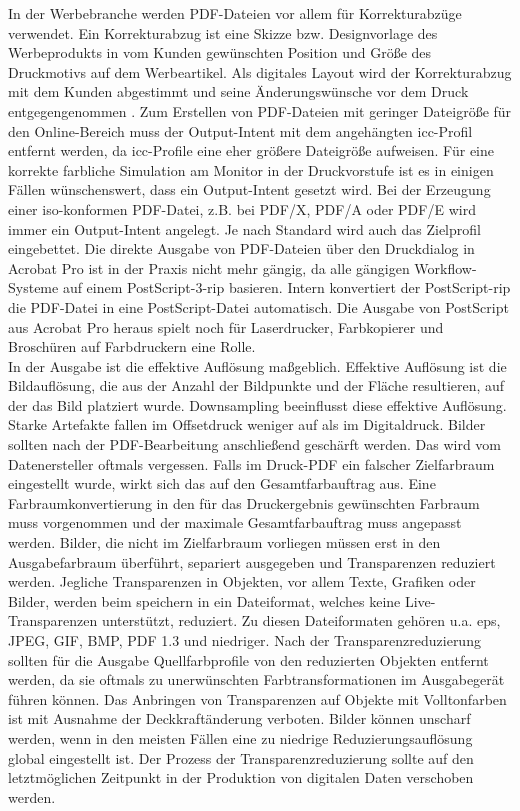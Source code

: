 In der Werbebranche werden PDF-Dateien vor allem für Korrekturabzüge verwendet. Ein Korrekturabzug ist eine Skizze bzw. Designvorlage des Werbeprodukts in vom Kunden gewünschten Position und Größe des Druckmotivs auf dem Werbeartikel. Als digitales Layout wird der Korrekturabzug mit dem Kunden abgestimmt und seine Änderungswünsche vor dem Druck entgegengenommen \cite{korrektur}. Zum Erstellen von PDF-Dateien mit geringer Dateigröße für den Online-Bereich muss der Output-Intent mit dem angehängten \gls{icc}-Profil entfernt werden, da \gls{icc}-Profile eine eher größere Dateigröße aufweisen. Für eine korrekte farbliche Simulation am Monitor in der Druckvorstufe ist es in einigen Fällen wünschenswert, dass ein Output-Intent gesetzt wird. Bei der Erzeugung einer \gls{iso}-konformen PDF-Datei, z.B. bei PDF/X, PDF/A oder PDF/E wird immer ein Output-Intent angelegt. Je nach Standard wird auch das Zielprofil eingebettet. Die direkte Ausgabe von PDF-Dateien über den Druckdialog in Acrobat Pro ist in der Praxis nicht mehr gängig, da alle gängigen Workflow-Systeme auf einem PostScript-3-\gls{rip} basieren. Intern konvertiert der PostScript-\gls{rip} die PDF-Datei in eine PostScript-Datei automatisch. Die Ausgabe von PostScript aus Acrobat Pro heraus spielt noch für Laserdrucker, Farbkopierer und Broschüren auf Farbdruckern eine Rolle. \\
In der Ausgabe ist die effektive Auflösung maßgeblich. Effektive Auflösung ist die Bildauflösung, die aus der Anzahl der Bildpunkte und der Fläche resultieren, auf der das Bild platziert wurde. Downsampling beeinflusst diese effektive Auflösung. Starke Artefakte fallen im Offsetdruck weniger auf als im Digitaldruck. Bilder sollten nach der PDF-Bearbeitung anschließend geschärft werden. Das wird vom Datenersteller oftmals vergessen. Falls im Druck-PDF ein falscher Zielfarbraum eingestellt wurde, wirkt sich das auf den Gesamtfarbauftrag aus. Eine Farbraumkonvertierung in den für das Druckergebnis gewünschten Farbraum muss vorgenommen und der maximale Gesamtfarbauftrag muss angepasst werden. Bilder, die nicht im Zielfarbraum vorliegen müssen erst in den Ausgabefarbraum überführt, separiert ausgegeben und Transparenzen reduziert werden. Jegliche Transparenzen in Objekten, vor allem Texte, Grafiken oder Bilder, werden beim speichern in ein Dateiformat, welches keine Live-Transparenzen unterstützt, reduziert. Zu diesen Dateiformaten gehören u.a. \gls{eps}, JPEG, GIF, BMP, PDF 1.3 und niedriger. Nach der Transparenzreduzierung sollten für die Ausgabe Quellfarbprofile von den reduzierten Objekten entfernt werden, da sie oftmals zu unerwünschten Farbtransformationen im Ausgabegerät führen können. Das Anbringen von Transparenzen auf Objekte mit Volltonfarben ist mit Ausnahme der Deckkraftänderung verboten. Bilder können unscharf werden, wenn in den meisten Fällen eine zu niedrige Reduzierungsauflösung global eingestellt ist. Der Prozess der Transparenzreduzierung sollte auf den letztmöglichen Zeitpunkt in der Produktion von digitalen Daten verschoben werden. \\

